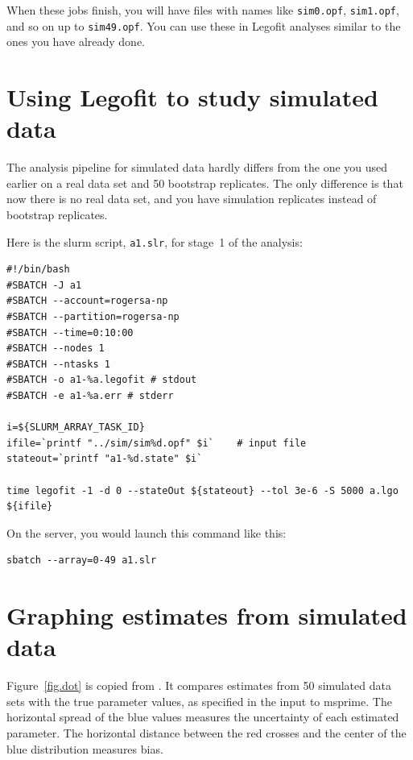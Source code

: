 \documentclass[11pt]{article}
\begin{document}
When these jobs finish, you will have files with names like
\texttt{sim0.opf}, \texttt{sim1.opf}, and so on up to
\texttt{sim49.opf}. You can use these in Legofit analyses similar to
the ones you have already done.

\section{Using Legofit to study simulated data}

The analysis pipeline for simulated data hardly differs from the one
you used earlier on a real data set and 50 bootstrap replicates. The
only difference is that now there is no real data set, and you have 
simulation replicates instead of bootstrap replicates.

Here is the slurm script, \texttt{a1.slr}, for stage~1 of the analysis:
\begin{verbatim}
#!/bin/bash
#SBATCH -J a1
#SBATCH --account=rogersa-np
#SBATCH --partition=rogersa-np
#SBATCH --time=0:10:00
#SBATCH --nodes 1
#SBATCH --ntasks 1
#SBATCH -o a1-%a.legofit # stdout
#SBATCH -e a1-%a.err # stderr

i=${SLURM_ARRAY_TASK_ID}
ifile=`printf "../sim/sim%d.opf" $i`    # input file
stateout=`printf "a1-%d.state" $i`

time legofit -1 -d 0 --stateOut ${stateout} --tol 3e-6 -S 5000 a.lgo ${ifile}
\end{verbatim}
On the server, you would launch this command like this:
\begin{verbatim}
sbatch --array=0-49 a1.slr
\end{verbatim}

\section{Graphing estimates from simulated data}

Figure~\ref{fig.dot} is copied from \citet{Rogers:PCJ-2-e32}. It
compares estimates from 50 simulated data sets with the true parameter
values, as specified in the input to msprime. The horizontal spread of
the blue values measures the uncertainty of each estimated
parameter. The horizontal distance between the red crosses and the
center of the blue distribution measures bias.
\end{document}
